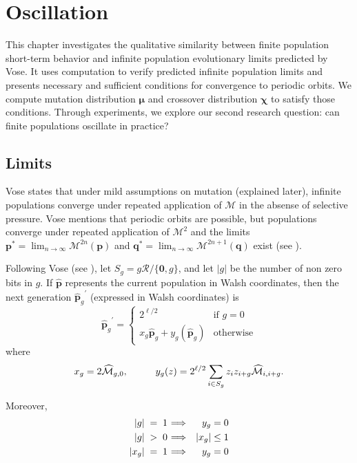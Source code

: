 \chapter{Oscillation} \label{ch:oscillation}
This chapter investigates the qualitative similarity between finite population 
short-term behavior and infinite population evolutionary limits predicted by Vose. 
It uses computation to verify predicted infinite population limits and presents 
necessary and sufficient conditions for convergence to periodic orbits. 
We compute mutation distribution $\bm{\mu}$ and crossover distribution $\bm{\chi}$ 
to satisfy those conditions. Through experiments, we explore our second research 
question: can finite populations oscillate in practice?

\section{Limits}
\label{Limits}
Vose states that under mild assumptions on mutation (explained later), infinite populations converge under repeated application 
of $\mathcal{M}$ in the absense of selective pressure. Vose mentions that periodic orbits are possible, but populations converge under 
repeated application of $\mathcal{M}^2$ and the limits $\bm{p}^\ast = \lim_{n \rightarrow \infty} \mathcal{M}^{2n}({\bm p})$ 
and ${\bm q}^\ast = \lim_{n \rightarrow \infty} \mathcal{M}^{2n+1}({\bm q})$ exist (see \cite{Vose1999}).

Following Vose (see \cite{Vose1999}), let $S_g = g \mathcal{R} / \{\textbf{0}, g\}$, and let $|g|$ be the number of non zero bits in $g$. 
If $\widehat{\bm{p}}$ represents the current population in Walsh coordinates, then the next generation ${\widehat{\bm{p}}_g}^{\prime}$ 
(expressed in Walsh coordinates) is 
\[
{{\widehat{\bm{p}}}_g}^{\prime}  = \begin{cases}
    2^{\ell /2}  & \text{if $g = 0$}\\
    x_g \widehat{{\bm p}}_g + y_g(\widehat{{\bm p}}_g) & \text{otherwise}
  \end{cases}
\]
where
\[
x_g = 2\widehat{\mathcal{M}}_{g,0},  \hspace*{1cm} y_g(z) = 2^{\ell /2} \sum_{i \in S_g} z_i z_{i+g} \widehat{\mathcal{M}}_{i,i+g}.
\]

Moreover, 
\begin{eqnarray*}
|g| \;=\; 1 \hspace{0.01in} & \Longrightarrow & y_g = 0 \\
|g| \;>\; 0 \hspace{0.01in} & \Longrightarrow & |x_g| \leq 1 \\
|x_g| \;=\; 1 \hspace{0.01in} & \Longrightarrow & y_g = 0
\end{eqnarray*}

